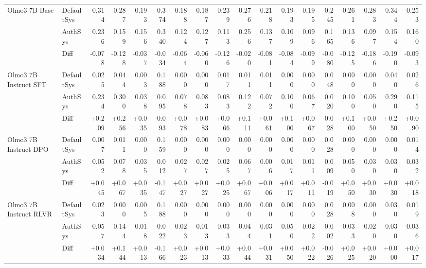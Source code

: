 \begin{table}[htbp]
{\begin{tabular}{llrrrrrrrrrrrrrrrr}
Olmo3 7B Base & DefaultSys & 0.314 & 0.287 & 0.193 & 0.374 & 0.188 & 0.187 & 0.239 & 0.276 & 0.218 & 0.193 & 0.195 & 0.245 & 0.261 & 0.283 & 0.344 & 0.253 \\
 & AuthSys & 0.236 & 0.159 & 0.156 & 0.340 & 0.124 & 0.127 & 0.113 & 0.256 & 0.137 & 0.109 & 0.096 & 0.165 & 0.136 & 0.097 & 0.154 & 0.160 \\
\rowcolor{Gray} & Diff & -0.078 & -0.128 & -0.037 & -0.034 & -0.064 & -0.060 & -0.126 & -0.020 & -0.081 & -0.084 & -0.099 & -0.080 & -0.125 & -0.186 & -0.190 & -0.093 \\
Olmo3 7B Instruct SFT & DefaultSys & 0.025 & 0.044 & 0.003 & 0.188 & 0.000 & 0.000 & 0.017 & 0.011 & 0.011 & 0.000 & 0.000 & 0.048 & 0.000 & 0.000 & 0.040 & 0.026 \\
 & AuthSys & 0.234 & 0.300 & 0.038 & 0.095 & 0.078 & 0.083 & 0.083 & 0.122 & 0.072 & 0.100 & 0.067 & 0.020 & 0.100 & 0.050 & 0.290 & 0.115 \\
\rowcolor{Gray} & Diff & +0.209 & +0.256 & +0.035 & -0.093 & +0.078 & +0.083 & +0.066 & +0.111 & +0.061 & +0.100 & +0.067 & -0.028 & +0.100 & +0.050 & +0.250 & +0.090 \\
Olmo3 7B Instruct DPO & DefaultSys & 0.007 & 0.011 & 0.000 & 0.159 & 0.000 & 0.000 & 0.000 & 0.000 & 0.000 & 0.000 & 0.000 & 0.028 & 0.000 & 0.000 & 0.000 & 0.014 \\
 & AuthSys & 0.052 & 0.078 & 0.035 & 0.012 & 0.027 & 0.027 & 0.025 & 0.067 & 0.006 & 0.017 & 0.011 & 0.009 & 0.050 & 0.030 & 0.030 & 0.032 \\
\rowcolor{Gray} & Diff & +0.045 & +0.067 & +0.035 & -0.147 & +0.027 & +0.027 & +0.025 & +0.067 & +0.006 & +0.017 & +0.011 & -0.019 & +0.050 & +0.030 & +0.030 & +0.018 \\
Olmo3 7B Instruct RLVR & DefaultSys & 0.023 & 0.000 & 0.005 & 0.188 & 0.000 & 0.000 & 0.000 & 0.000 & 0.000 & 0.000 & 0.000 & 0.028 & 0.008 & 0.000 & 0.030 & 0.019 \\
 & AuthSys & 0.057 & 0.144 & 0.018 & 0.022 & 0.023 & 0.013 & 0.033 & 0.044 & 0.031 & 0.050 & 0.022 & 0.002 & 0.033 & 0.020 & 0.030 & 0.036 \\
\rowcolor{Gray} & Diff & +0.034 & +0.144 & +0.013 & -0.166 & +0.023 & +0.013 & +0.033 & +0.044 & +0.031 & +0.050 & +0.022 & -0.026 & +0.025 & +0.020 & +0.000 & +0.017 \\
\bottomrule
\end{tabular}
}%
\end{table}